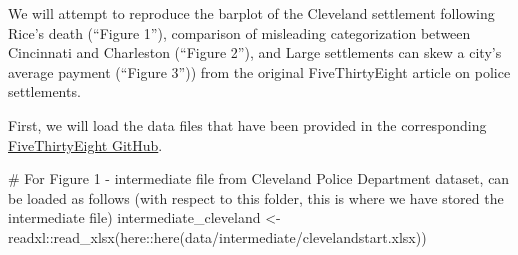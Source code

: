 \documentclass[
  letterpaper,
  DIV=11,
  numbers=noendperiod]{scrartcl}
\newenvironment{Shaded}{\begin{snugshade}}{\end{snugshade}}
\newcommand{\CommentTok}[1]{\textcolor[rgb]{0.37,0.37,0.37}{#1}}
\newcommand{\FunctionTok}[1]{\textcolor[rgb]{0.28,0.35,0.67}{#1}}
\newcommand{\NormalTok}[1]{\textcolor[rgb]{0.00,0.23,0.31}{#1}}
\newcommand{\OtherTok}[1]{\textcolor[rgb]{0.00,0.23,0.31}{#1}}
\newcommand{\SpecialCharTok}[1]{\textcolor[rgb]{0.37,0.37,0.37}{#1}}
\newcommand{\StringTok}[1]{\textcolor[rgb]{0.13,0.47,0.30}{#1}}
\begin{document}
We will attempt to reproduce the barplot of the Cleveland settlement
following Rice's death (``Figure 1''), comparison of misleading
categorization between Cincinnati and Charleston (``Figure 2''), and
Large settlements can skew a city's average payment (``Figure 3'')) from
the original FiveThirtyEight article on police settlements.

First, we will load the data files that have been provided in the
corresponding
\href{'https://github.com/fivethirtyeight/police-settlements/'}{FiveThirtyEight
GitHub}.

\begin{Shaded}
\begin{Highlighting}[]
\CommentTok{\# For Figure 1 {-} intermediate file from Cleveland Police Department dataset, can be loaded as follows (with respect to this folder, this is where we have stored the intermediate file)}
\NormalTok{intermediate\_cleveland }\OtherTok{\textless{}{-}}\NormalTok{ readxl}\SpecialCharTok{::}\FunctionTok{read\_xlsx}\NormalTok{(here}\SpecialCharTok{::}\FunctionTok{here}\NormalTok{(}\StringTok{\textquotesingle{}data/intermediate/clevelandstart.xlsx\textquotesingle{}}\NormalTok{))}


\end{Highlighting}
\end{Shaded}
\end{document}
